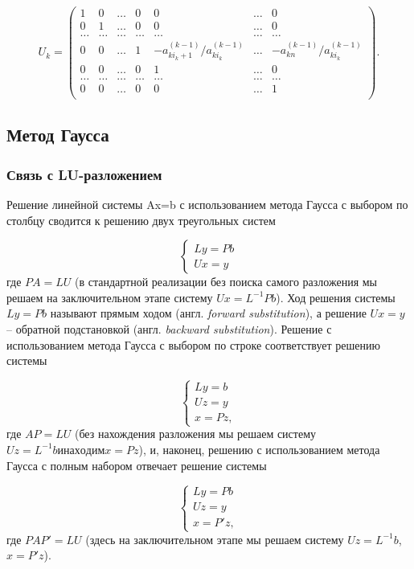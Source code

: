 \[
U_k = 
\begin{pmatrix}
	1 & 0 &	\hdots & 0 & 0 & \hdots	& 0			\\
	0 & 1 & \hdots & 0 & 0 & \hdots	& 0				\\
	\hdots & \hdots & \hdots & \hdots & \hdots & \hdots & \hdots \\
	0 & 0 & \hdots & 1 & -a^{(k-1)}_{k i_{k}+1} / a^{(k-1)}_{k i_k} & \hdots & 
						 -a^{(k-1)}_{k n} / a^{(k-1)}_{k i_k}		\\
	0 & 0 & \hdots & 0 & 1 & \hdots	& 0					\\
	\hdots & \hdots & \hdots & \hdots & \hdots & \hdots & \hdots \\
	0 & 0 & \hdots & 0 & 0 & \hdots & 1					\\		
\end{pmatrix}.
\]
			
\subsection{Метод Гаусса}
\subsubsection{Связь с LU-разложением}

Решение линейной системы Ax=b с использованием метода Гаусса с выбором по столбцу сводится к решению двух треугольных систем

\[
\begin{cases}
     Ly=Pb   \\
     Ux=y    
\end{cases}
\]
где $PA=LU$ (в стандартной реализации без поиска самого разложения мы решаем на заключительном этапе систему $Ux=L^{-1}Pb$). Ход решения системы $Ly=Pb$ называют прямым ходом (англ. \textit{forward substitution}), а решение $Ux=y$ – обратной подстановкой (англ. \textit{backward substitution}).
Решение с использованием метода Гаусса с выбором по строке соответствует решению системы

\[
\begin{cases}
	Ly = b \\
	Uz = y \\
	x = Pz,
\end{cases}
\] 
где $AP=LU$ (без нахождения разложения мы решаем систему $Uz=L^{-1}b и находим x=Pz$), и, наконец, решению с использованием метода Гаусса с полным набором отвечает решение системы 

\[
\begin{cases}
	Ly = Pb \\
	Uz = y  \\
	x = P'z,
\end{cases}
\] 
где $PAP'=LU$ (здесь на заключительном этапе мы решаем систему $Uz = L^{-1}b$, $x=P'z$). 


